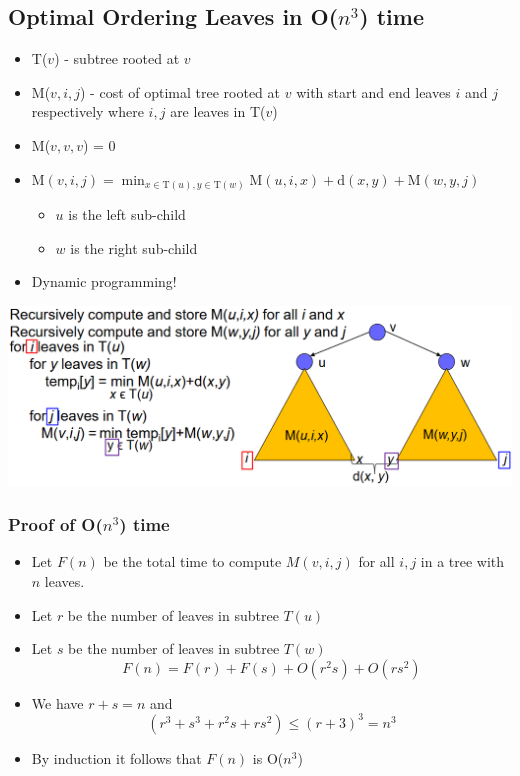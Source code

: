 \documentclass[10pt]{article}
\begin{document}
\subsection*{Optimal Ordering Leaves in O($n^3$) time}
\begin{itemize}
    \item T($v$) - subtree rooted at $v$
    \item M($v, i, j$) - cost of optimal tree rooted at $v$ with start and end leaves $i$ and $j$ respectively where $i, j$ are leaves in T($v$)
    \item M($v, v, v$) = 0
    \item $\text{M}(v, i, j) = \min_{x \in \text{T}(u), y \in \text{T}(w)} \text{M}(u, i, x) + \text{d}(x, y) + \text{M}(w, y, j)$
    \begin{itemize}
        \item $u$ is the left sub-child
        \item $w$ is the right sub-child
    \end{itemize}
    \item Dynamic programming!
\end{itemize}
\begin{center}
    \includegraphics[width=\textwidth]{W6_18.png}
\end{center}
\subsubsection*{Proof of O($n^3$) time}
\begin{itemize}
    \item Let $F(n)$ be the total time to compute $M(v, i, j)$ for all $i, j$ in a tree with $n$ leaves.
    \item Let $r$ be the number of leaves in subtree $T(u)$
    \item Let $s$ be the number of leaves in subtree $T(w)$
    \[F(n) = F(r) + F(s) + O(r^2s) + O(rs^2)\]
    \item We have $r + s = n$ and
    \[(r^3 + s^3 + r^2s + rs^2) \leq (r + 3)^3 = n^3\]
    \item By induction it follows that $F(n)$ is O($n^3$)
\end{itemize}
\end{document}
